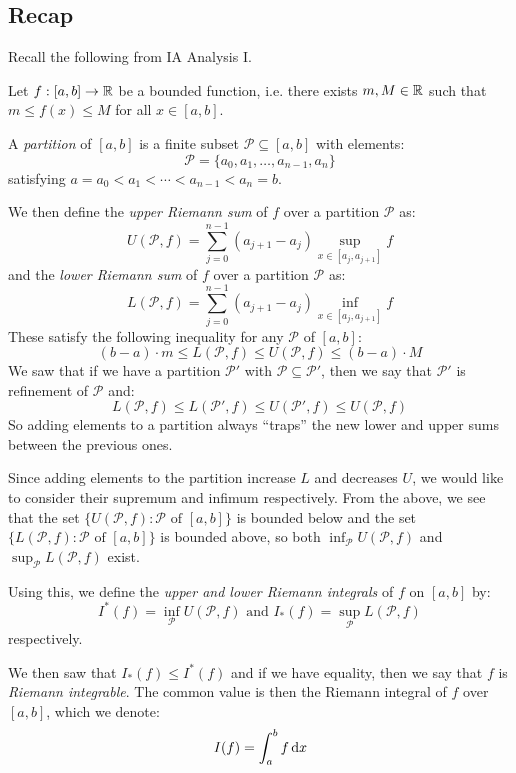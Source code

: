 \documentclass[../main.tex]{subfiles}
\begin{document}
\subsection{Recap}
\begin{remark}[Recap]
  Recall the following from IA Analysis I.

  Let $f: [a, b] \to \mathbb{R}$ be a bounded function, i.e. there exists $m, M \in \mathbb{R}$ such that $m \leq f(x) \leq M$ for all $x \in [a, b]$.

  A \textit{partition} of $[a, b]$ is a finite subset $\mathcal{P} \subseteq [a, b]$ with elements:
  \[
    \mathcal{P} = \{a_0, a_1, \ldots, a_{n - 1}, a_n\}
  \]
  satisfying $a = a_0 < a_1 < \cdots < a_{n - 1} < a_n = b$.

  We then define the \textit{upper Riemann sum} of $f$ over a partition $\mathcal{P}$ as:
  \[
    U(\mathcal{P}, f) = \sum_{j = 0}^{n - 1} (a_{j + 1} - a_j) \sup_{x \in [a_j, a_{j + 1}]} f
  \]
  and the \textit{lower Riemann sum} of $f$ over a partition $\mathcal{P}$ as:
  \[
    L(\mathcal{P}, f) = \sum_{j = 0}^{n - 1} (a_{j + 1} - a_j) \inf_{x \in [a_j, a_{j + 1}]} f
  \]
  These satisfy the following inequality for any $\mathcal{P}$ of $[a, b]$:
  \[
    (b - a) \cdot m \leq L(\mathcal{P}, f) \leq U(\mathcal{P}, f) \leq (b - a) \cdot M
  \]
  We saw that if we have a partition $\mathcal{P}'$ with $\mathcal{P} \subseteq \mathcal{P}'$, then we say that $\mathcal{P}'$ is  refinement of $\mathcal{P}$ and:
  \[
    L(\mathcal{P}, f) \leq L(\mathcal{P}', f) \leq U(\mathcal{P}', f) \leq U(\mathcal{P}, f)
  \]
  So adding elements to a partition always ``traps'' the new lower and upper sums between the previous ones.

  Since adding elements to the partition increase $L$ and decreases $U$, we would like to consider their supremum and infimum respectively.
  From the above, we see that the set $\{U(\mathcal{P}, f): \mathcal{P} \text{ of } [a, b]\}$ is bounded below and the set $\{L(\mathcal{P}, f): \mathcal{P} \text{ of } [a, b]\}$ is bounded above, so both $\inf_{\mathcal{P}} U(\mathcal{P}, f)$ and $\sup_{\mathcal{P}} L(\mathcal{P}, f)$ exist.

  Using this, we define the \textit{upper and lower Riemann integrals} of $f$ on $[a, b]$ by:
  \[
    I^{*}(f) = \inf_{\mathcal{P}} U(\mathcal{P}, f) \text{ and } I_{*}(f) = \sup_{\mathcal{P}} L(\mathcal{P}, f)
  \]
  respectively.

  We then saw that $I_{*}(f) \leq I^{*}(f)$ and if we have equality, then we say that $f$ is \textit{Riemann integrable}.
  The common value is then the Riemann integral of $f$ over $[a, b]$, which we denote:
  \[
    I(f) = \int_{a}^{b} f \d{x}
  \]
\end{remark}
\end{document}
